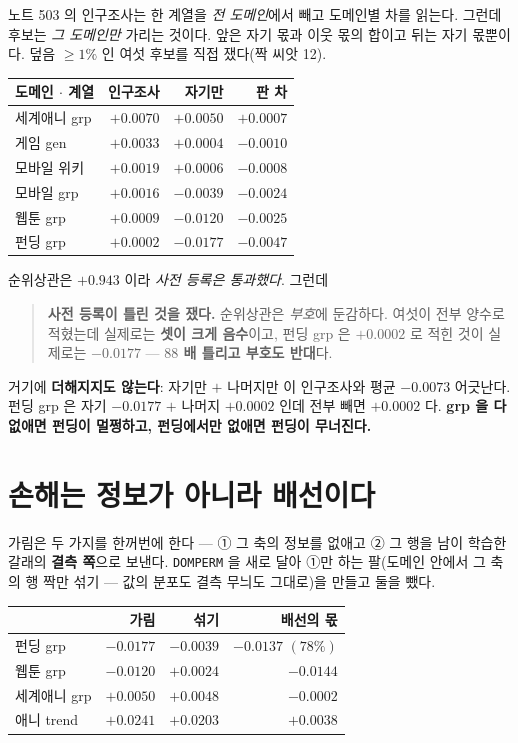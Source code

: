 \documentclass[11pt]{article}
\begin{document}
노트 503 의 인구조사는 한 계열을 \emph{전 도메인}에서 빼고 도메인별 차를
읽는다. 그런데 후보는 \emph{그 도메인만} 가리는 것이다. 앞은 자기 몫과
이웃 몫의 합이고 뒤는 자기 몫뿐이다. 덮음 $\ge 1\%$ 인 여섯 후보를
직접 쟀다(짝 씨앗 12).

\begin{center}
\begin{tabular}{lrrr}
\hline
도메인 $\cdot$ 계열 & 인구조사 & \textbf{자기만} & 판 차 \\
\hline
세계애니 grp & $+0.0070$ & $\mathbf{+0.0050}$ & $+0.0007$ \\
게임 gen & $+0.0033$ & $+0.0004$ & $-0.0010$ \\
모바일 위키 & $+0.0019$ & $+0.0006$ & $-0.0008$ \\
모바일 grp & $+0.0016$ & $\mathbf{-0.0039}$ & $-0.0024$ \\
웹툰 grp & $+0.0009$ & $\mathbf{-0.0120}$ & $-0.0025$ \\
펀딩 grp & $+0.0002$ & $\mathbf{-0.0177}$ & $-0.0047$ \\
\hline
\end{tabular}
\end{center}

순위상관은 $+0.943$ 이라 \emph{사전 등록은 통과했다}. 그런데

\begin{quote}
\textbf{사전 등록이 틀린 것을 쟀다.} 순위상관은 \emph{부호}에 둔감하다.
여섯이 전부 양수로 적혔는데 실제로는 \textbf{셋이 크게 음수}이고, 펀딩
grp 은 $+0.0002$ 로 적힌 것이 실제로는 $-0.0177$ --- \textbf{$88$ 배 틀리고
부호도 반대}다.
\end{quote}

거기에 \textbf{더해지지도 않는다}: 자기만 $+$ 나머지만 이 인구조사와
평균 $-0.0073$ 어긋난다. 펀딩 grp 은 자기 $-0.0177$ $+$ 나머지 $+0.0002$
인데 전부 빼면 $+0.0002$ 다. \textbf{grp 을 다 없애면 펀딩이 멀쩡하고,
펀딩에서만 없애면 펀딩이 무너진다.}

\section{손해는 정보가 아니라 배선이다}

가림은 두 가지를 한꺼번에 한다 --- ① 그 축의 정보를 없애고 ② 그 행을 남이
학습한 갈래의 \textbf{결측 쪽}으로 보낸다. \texttt{DOMPERM} 을 새로 달아
①만 하는 팔(도메인 안에서 그 축의 행 짝만 섞기 --- 값의 분포도 결측 무늬도
그대로)을 만들고 둘을 뺐다.

\begin{center}
\begin{tabular}{lrrr}
\hline
 & 가림 & 섞기 & \textbf{배선의 몫} \\
\hline
펀딩 grp & $-0.0177$ & $-0.0039$ & $\mathbf{-0.0137}$ $(78\%)$ \\
웹툰 grp & $-0.0120$ & $\mathbf{+0.0024}$ & $-0.0144$ \\
세계애니 grp & $+0.0050$ & $+0.0048$ & $-0.0002$ \\
애니 trend & $+0.0241$ & $+0.0203$ & $\mathbf{+0.0038}$ \\
\hline
\end{tabular}
\end{center}
\end{document}
